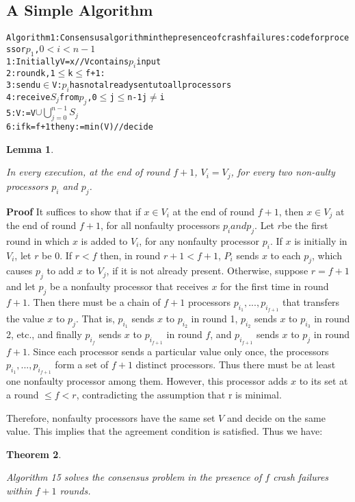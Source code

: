 \documentclass{article}
\newtheorem{thm}{Theorem}[section]
\newtheorem{lem}[thm]{Lemma}
\newenvironment{theorem}{\begin{thm}\begin{rm}}%
{\end{rm}\end{thm}}
\newenvironment{lemma}{\begin{lem}\begin{rm}}%
{\end{rm}\end{lem}}
\begin{document}
\subsection{A Simple Algorithm}
\begin{alltt}
Algorithm 1: Consensus algorithm in the presence of crash failures: code for processor $p_1$, $0<i<n-1$
1:Initially V ={x} // V contains \(p_i\) input
2:round k, 1 \(\leq\) k \(\leq\) f+1:
	3:send {u \(\in\) V: \(p_i\) has not already sent u} to all processors
	4:receive \(S_j\) from \(p_j\), 0\(\leq\) j \(\leq\) n-1 j\(\neq\) i
	5:V := V \(\cup\) \(\bigcup^{n-1}_{j=0}\) \(S_j\)
	6:if k = f+1 then y:= min(V) //decide
\end{alltt}
\begin{lemma}
In every execution, at the end of round $f + 1$, $V_i =  V_j$, for every two non-aulty processors $p_i$ and $p_j$. 
\end{lemma}
\textbf{Proof} It suffices to show that if $x \in V_i$ at the end of round $f + 1$, then $x 
\in V_j$ at the end of round $f + 1$, for all nonfaulty processors $p_i and p_j$. Let $r $be the first round in which $x$ is added to $V_i$, for any nonfaulty processor $p_i$. If $x$ is initially in $V_i$, let $r$ be 0. If $r < f$ then, in round $r + 1 < f + 1$, $P_i$ sends $x$ to each $p_j$, which causes $p_j$ to add $x$ to $V_j$, if it is not already present. Otherwise, suppose $r =  f + 1$ and let $p_j$ be a nonfaulty processor that receives $x$ for the first time in round $f + 1$. Then there must be a chain of $f+ 1$ processors $p_{i_1},...,p_{i_{f+1}}$ that transfers the value $x$ to $p_j$. That is, $p_{i_1}$ sends $x$ to $p_{i_2}$ in round 1, $p_{i_2}$ sends $x$ to $p_{i_3}$ in round 2, etc., and finally $p_{i_f}$ sends $x$ to $p_{i_{f+1}}$ in round $f$, and $p_{i_{f+1}}$ sends $x$ to $p_j$ in round $f + 1$. Since each processor sends a particular value only once, the processors $p_{i_1},..., p_{i_{f+1}}$ form a set of $f+ 1$ distinct processors. Thus there must be at least one nonfaulty processor among them. However, this processor adds $x$ to its set at a round $\leq f < r$, contradicting the assumption that r is minimal. 

Therefore, nonfaulty processors have the same set $V$ and decide on the same value. This implies that the agreement condition is satisfied. Thus we have: 

\begin{theorem} Algorithm 15 solves the consensus problem in the presence of $f$ crash failures within $f + 1$ rounds.
\end{theorem} 
\end{document}
